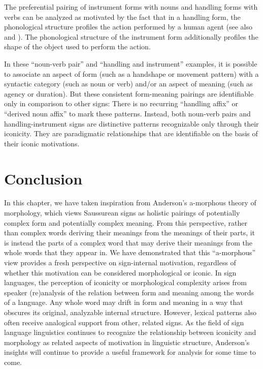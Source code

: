 \documentclass[output=paper,
modfonts
]{LSP/langsci}
\begin{document}
  The preferential pairing of instrument forms with nouns and handling forms with verbs can be analyzed as motivated by the fact that in a handling form, the phonological structure profiles the action performed by a human agent (see also \citealt{Brentari2012} and \citealt{Hwang2016}). The phonological structure of the instrument form additionally profiles the shape of the object used to perform the action.

  In these ``noun-verb pair'' and ``handling and instrument'' examples, it is possible to associate an aspect of form (such as a handshape or movement pattern) with a syntactic category (such as noun or verb) and/or an aspect of meaning (such as agency or duration). But these consistent form-meaning pairings are identifiable only in comparison to other signs: There is no recurring ``handling affix'' or ``derived noun affix'' to mark these patterns. Instead, both noun-verb pairs and handling-instrument signs are distinctive patterns recognizable only through their iconicity. They are paradigmatic relationships that are identifiable on the basis of their iconic motivations.

\section{Conclusion}

In this chapter, we have taken inspiration from Anderson's a-morphous theory of morphology, which views Saussurean signs as holistic pairings of potentially complex form and potentially complex meaning. From this perspective, rather than complex words deriving their meanings from the meanings of their parts, it is instead the parts of a complex word that may derive their meanings from the whole words that they appear in. We have demonstrated that this ``a-morphous'' view provides a fresh perspective on sign-internal motivation, regardless of whether this motivation can be considered morphological or iconic. In sign languages, the perception of iconicity or morphological complexity arises from speaker (re)analysis of the relation between form and meaning among the words of a language. Any whole word may drift in form and meaning in a way that obscures its original, analyzable internal structure. However, lexical patterns also often receive analogical support from other, related signs. As the field of sign language linguistics continues to recognize the relationship between iconicity and morphology as related aspects of motivation in linguistic structure, Anderson's insights will continue to provide a useful framework for analysis for some time to come.
\end{document}
